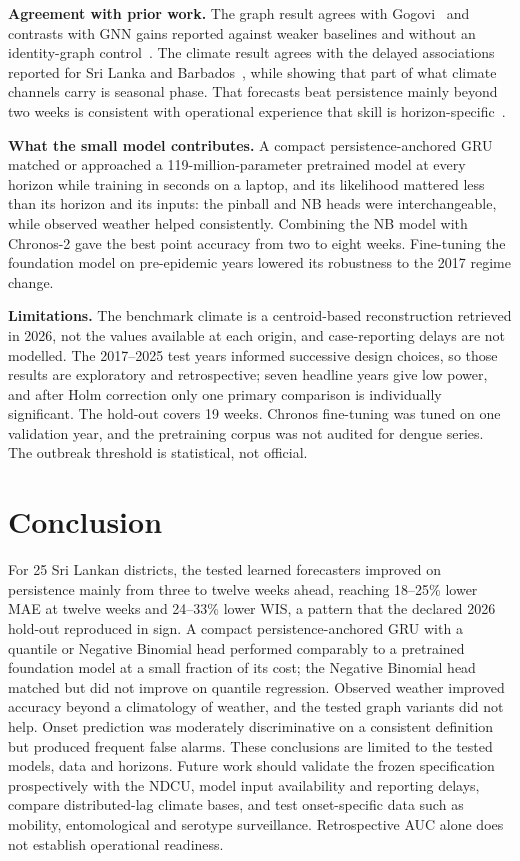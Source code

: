 \textbf{Agreement with prior work.} The graph result agrees with Gogovi~\cite{gogovi2026spatial} and contrasts with GNN gains reported against weaker baselines and without an identity-graph control~\cite{weng2024graph,gulmohamed2026denguegnn}. The climate result agrees with the delayed associations reported for Sri Lanka and Barbados~\cite{liu2025explainable,lowe2018barbados}, while showing that part of what climate channels carry is seasonal phase. That forecasts beat persistence mainly beyond two weeks is consistent with operational experience that skill is horizon-specific~\cite{colongonzalez2021probabilistic}.

\textbf{What the small model contributes.} A compact persistence-anchored GRU matched or approached a 119-million-parameter pretrained model at every horizon while training in seconds on a laptop, and its likelihood mattered less than its horizon and its inputs: the pinball and NB heads were interchangeable, while observed weather helped consistently. Combining the NB model with Chronos-2 gave the best point accuracy from two to eight weeks. Fine-tuning the foundation model on pre-epidemic years lowered its robustness to the 2017 regime change.

\textbf{Limitations.} The benchmark climate is a centroid-based reconstruction retrieved in 2026, not the values available at each origin, and case-reporting delays are not modelled. The 2017--2025 test years informed successive design choices, so those results are exploratory and retrospective; seven headline years give low power, and after Holm correction only one primary comparison is individually significant. The hold-out covers 19 weeks. Chronos fine-tuning was tuned on one validation year, and the pretraining corpus was not audited for dengue series. The outbreak threshold is statistical, not official.

\section{Conclusion}

For 25 Sri Lankan districts, the tested learned forecasters improved on persistence mainly from three to twelve weeks ahead, reaching 18--25\% lower MAE at twelve weeks and 24--33\% lower WIS, a pattern that the declared 2026 hold-out reproduced in sign. A compact persistence-anchored GRU with a quantile or Negative Binomial head performed comparably to a pretrained foundation model at a small fraction of its cost; the Negative Binomial head matched but did not improve on quantile regression. Observed weather improved accuracy beyond a climatology of weather, and the tested graph variants did not help. Onset prediction was moderately discriminative on a consistent definition but produced frequent false alarms. These conclusions are limited to the tested models, data and horizons. Future work should validate the frozen specification prospectively with the NDCU, model input availability and reporting delays, compare distributed-lag climate bases, and test onset-specific data such as mobility, entomological and serotype surveillance. Retrospective AUC alone does not establish operational readiness.





